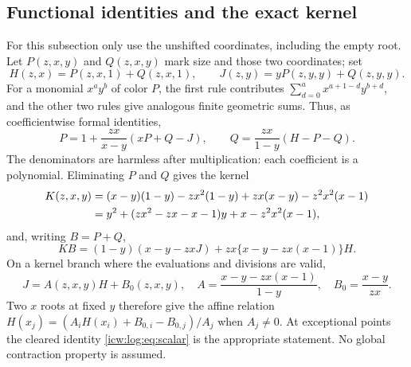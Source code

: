 \documentclass[11pt,letterpaper]{article}
\theoremstyle{remark}\newtheorem{remark}[theorem]{Remark}
\newcommand{\1}{\mathbf1}
\begin{document}
\subsection{Functional identities and the exact kernel}\label{icw:log:sub:kernel}
For this subsection only use the unshifted coordinates, including the
empty root. Let $P(z,x,y)$ and $Q(z,x,y)$ mark size and those two
coordinates; set
\[
 H(z,x)=P(z,x,1)+Q(z,x,1),\qquad
 J(z,y)=yP(z,y,y)+Q(z,y,y).
\]
For a monomial $x^ay^b$ of color $P$, the first rule contributes
$\sum_{d=0}^a x^{a+1-d}y^{b+d}$, and the other two rules give analogous
finite geometric sums. Thus, as coefficientwise formal identities,
\begin{equation}\label{icw:log:eq:fe}
 P=1+\frac{zx}{x-y}(xP+Q-J),\qquad
 Q=\frac{zx}{1-y}(H-P-Q).
\end{equation}
The denominators are harmless after multiplication: each coefficient is
a polynomial. Eliminating $P$ and $Q$ gives the kernel
\begin{align}
 K(z,x,y)&=(x-y)(1-y)-zx^2(1-y)+zx(x-y)-z^2x^2(x-1)\notag\\
 &=y^2+(zx^2-zx-x-1)y+x-z^2x^2(x-1),\label{icw:log:eq:kernel}
\end{align}
and, writing $B=P+Q$,
\begin{equation}\label{icw:log:eq:scalar}
 KB=(1-y)(x-y-zxJ)+zx\{x-y-zx(x-1)\}H.
\end{equation}
On a kernel branch where the evaluations and divisions are valid,
\[
 J=A(z,x,y)H+B_0(z,x,y),\quad
 A=\frac{x-y-zx(x-1)}{1-y},\quad B_0=\frac{x-y}{zx}.
\]
Two $x$ roots at fixed $y$ therefore give the affine relation
$H(x_j)=(A_iH(x_i)+B_{0,i}-B_{0,j})/A_j$ when $A_j\ne0$.
At exceptional points the cleared identity \eqref{icw:log:eq:scalar} is the
appropriate statement. No global contraction property is assumed.
\end{document}
